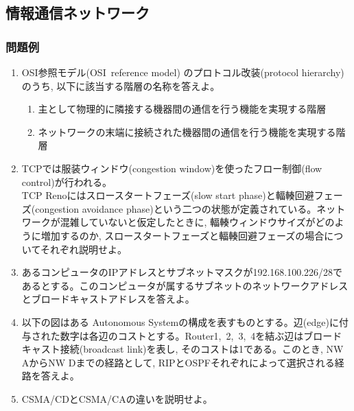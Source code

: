 \documentclass[dvipdfmx,titlepage, 11pt, a4paper]{jsarticle}%
\begin{document}
\subsection{情報通信ネットワーク}
\subsubsection{問題例}
\begin{enumerate}[(1)]
\item OSI参照モデル(OSI\ reference model) のプロトコル改装(protocol hierarchy)のうち, 以下に該当する階層の名称を答えよ。
  \begin{enumerate}[(${1}-$a)]
  \item 主として物理的に隣接する機器間の通信を行う機能を実現する階層
  \item  ネットワークの末端に接続された機器間の通信を行う機能を実現する階層
  \end{enumerate}
\item TCPでは服装ウィンドウ(congestion window)を使ったフロー制御(flow control)が行われる。\\
  TCP Renoにはスロースタートフェーズ(slow start phase)と輻輳回避フェーズ(congestion avoidance phase)という二つの状態が定義されている。ネットワークが混雑していないと仮定したときに, 輻輳ウィンドウサイズがどのように増加するのか, スロースタートフェーズと輻輳回避フェーズの場合についてそれぞれ説明せよ。
\item あるコンピュータのIPアドレスとサブネットマスクが192.168.100.226/28であるとする。このコンピュータが属するサブネットのネットワークアドレスとブロードキャストアドレスを答えよ。
\item 以下の図はある Autonomous Systemの構成を表すものとする。辺(edge)に付与された数字は各辺のコストとする。Router1,\ 2,\ 3,\ 4を結ぶ辺はブロードキャスト接続(broadcast link)を表し, そのコストは1である。このとき, NW AからNW Dまでの経路として, RIPとOSPFそれぞれによって選択される経路を答えよ。
\item CSMA/CDとCSMA/CAの違いを説明せよ。
\end{enumerate}
\end{document}
